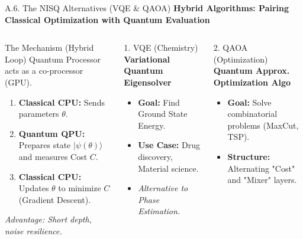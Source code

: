 \documentclass[aspectratio=169, 10pt]{beamer}
\begin{document}
\begin{frame}{A.6. The NISQ Alternatives (VQE \& QAOA)}
    \centering
    \textbf{Hybrid Algorithms: Pairing Classical Optimization with Quantum Evaluation}

    \begin{columns}[t]
        \begin{block}{The Mechanism (Hybrid Loop)}
            Quantum Processor acts as a co-processor (GPU).
            \begin{enumerate}
                \item \textbf{Classical CPU:} Sends parameters $\theta$.
                \item \textbf{Quantum QPU:} Prepares state $|\psi(\theta)\rangle$ and measures Cost $C$.
                \item \textbf{Classical CPU:} Updates $\theta$ to minimize $C$ (Gradient Descent).
            \end{enumerate}
            \textit{Advantage: Short depth, noise resilience.}
        \end{block}

        \begin{exampleblock}{1. VQE (Chemistry)}
            \textbf{Variational Quantum Eigensolver}
            \begin{itemize}
                \item \textbf{Goal:} Find Ground State Energy.
                \item \textbf{Use Case:} Drug discovery, Material science.
                \item \textit{Alternative to Phase Estimation.}
            \end{itemize}
        \end{exampleblock}

        \begin{alertblock}{2. QAOA (Optimization)}
            \textbf{Quantum Approx. Optimization Algo}
            \begin{itemize}
                \item \textbf{Goal:} Solve combinatorial problems (MaxCut, TSP).
                \item \textbf{Structure:} Alternating "Cost" and "Mixer" layers.
            \end{itemize}
        \end{alertblock}
    \end{columns}
\end{frame}
\end{document}
